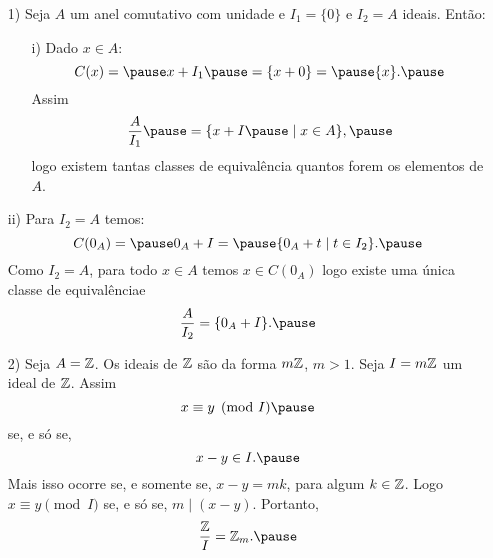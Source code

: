 \documentclass{beamer}
\begin{document}
    \begin{frame}
        \begin{exemplos}
            \begin{enumerate}
                \item[1)] Seja $A$ um anel comutativo com unidade \pause e $I_{1} = \{0\}$ \pause e $I_{2} = A$ ideais. \pause Ent\~ao:\pause
                \begin{enumerate}
                    \item[i)] Dado $x \in A$:\pause
                    \[
                        C(x) = \pause x + I_{1} \pause = \{x + 0\} = \pause \{x\}.\pause 
                    \]
                    Assim
                    \[
                        \dfrac{A}{I_{1}} \pause = \{x + I \pause \mid x \in A\},\pause
                    \]
                    logo existem tantas classes de equival{\^e}ncia \pause quantos forem os elementos de $A$.\pause
                \end{enumerate}
            \end{enumerate}
        \end{exemplos}
    \end{frame}

    \begin{frame}
        \begin{exemplos}
            \begin{enumerate}
                \item[ii)] Para $I_{2} = A$ \pause temos:
                \[
                    C(0_A) = \pause 0_A + I = \pause \{0_A + t \mid t \in I_{2}\}.\pause 
                \]
                Como $I_2 = A$, \pause para todo $x \in A$ \pause temos $x \in C(0_A)$ \pause logo existe uma \'unica \pause classe de equival\^encia\pause e
                \[
                    \dfrac{A}{I_{2}} = \{0_{A} + I\}.\pause
                \]
            \end{enumerate}
        \end{exemplos}
    \end{frame}

    \begin{frame}
        \begin{exemplos}
            \begin{enumerate}
                \item[2)] Seja $A = \mathbb{Z}$. \pause Os ideais de $\mathbb{Z}$ \pause s{\~a}o da forma $m\mathbb{Z}$, \pause $m > 1$. \pause Seja $I = m\mathbb{Z}$ \pause um ideal de $\mathbb{Z}$. \pause Assim\pause
                \[
                    x\equiv y \pmod I\pause 
                \]
                se, e s\'o se, 
                \[
                    x - y \in I.\pause
                \]
                Mais isso ocorre \pause se, e somente se, \pause $x - y = mk $, \pause para algum $k \in \mathbb{Z}$. \pause Logo $x\equiv y \pmod I$ \pause se, e s\'o se, \pause $m\mid (x - y)$. \pause  Portanto,
                \[
                    \dfrac{\z}{I} = \z_m.\pause
                \]
            \end{enumerate}
        \end{exemplos}
    \end{frame}
\end{document}
